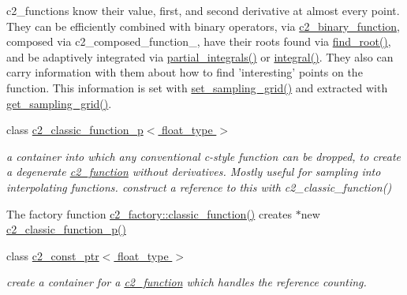 \begin{DoxyCompactItemize}
\begin{DoxyCompactList}
c2\-\_\-functions know their value, first, and second derivative at almost every point. They can be efficiently combined with binary operators, via \hyperlink{classc2__binary__function}{c2\-\_\-binary\-\_\-function}, composed via c2\-\_\-composed\-\_\-function\-\_\-, have their roots found via \hyperlink{classc2__function_acd17a7191226578c866d82cb2e9ff89f}{find\-\_\-root()}, and be adaptively integrated via \hyperlink{classc2__function_a89ce5e2f44ebfaf9eb4d66605cde4fde}{partial\-\_\-integrals()} or \hyperlink{classc2__function_a675c5056562332be2e49b38485d322b7}{integral()}. They also can carry information with them about how to find 'interesting' points on the function. This information is set with \hyperlink{classc2__function_a23828c75121b442899ab7a80cf5abbb0}{set\-\_\-sampling\-\_\-grid()} and extracted with \hyperlink{classc2__function_ad03264dcc015e5d0b1b6eb30df3f32be}{get\-\_\-sampling\-\_\-grid()}. \end{DoxyCompactList}\item 
class \hyperlink{classc2__classic__function__p}{c2\-\_\-classic\-\_\-function\-\_\-p$<$ float\-\_\-type $>$}
\begin{DoxyCompactList}\small\item\em a container into which any conventional c-\/style function can be dropped, to create a degenerate \hyperlink{classc2__function}{c2\-\_\-function} without derivatives. Mostly useful for sampling into interpolating functions. construct a reference to this with c2\-\_\-classic\-\_\-function()

The factory function \hyperlink{classc2__factory_ae5c9140b2bfcc6416682562b99479974}{c2\-\_\-factory\-::classic\-\_\-function()} creates $\ast$new \hyperlink{classc2__classic__function__p_a8b2d09d67a8835902fd6c684d5b183b7}{c2\-\_\-classic\-\_\-function\-\_\-p()} \end{DoxyCompactList}\item 
class \hyperlink{classc2__const__ptr}{c2\-\_\-const\-\_\-ptr$<$ float\-\_\-type $>$}
\begin{DoxyCompactList}\small\item\em create a container for a \hyperlink{classc2__function}{c2\-\_\-function} which handles the reference counting.


\end{DoxyCompactList}
\end{DoxyCompactItemize}
